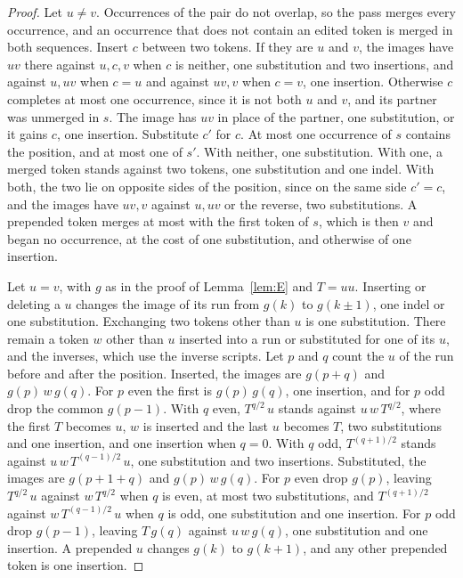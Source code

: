 \documentclass[11pt,a4paper]{article}
\theoremstyle{definition}
\theoremstyle{plain}
\begin{document}
\begin{proof}
Let \(u \ne v\). Occurrences of the pair do not overlap, so the pass merges every occurrence, and an occurrence that
does not contain an edited token is merged in both sequences. Insert \(c\) between two tokens. If they are \(u\) and
\(v\), the images have \(uv\) there against \(u, c, v\) when \(c\) is neither, one substitution and two insertions, and
against \(u, uv\) when \(c = u\) and against \(uv, v\) when \(c = v\), one insertion. Otherwise \(c\) completes at most
one occurrence, since it is not both \(u\) and \(v\), and its partner was unmerged in \(s\). The image has \(uv\) in
place of the partner, one substitution, or it gains \(c\), one insertion. Substitute \(c'\) for \(c\). At most one
occurrence of \(s\) contains the position, and at most one of \(s'\). With neither, one substitution. With one, a merged
token stands against two tokens, one substitution and one indel. With both, the two lie on opposite sides of the
position, since on the same side \(c' = c\), and the images have \(uv, v\) against \(u, uv\) or the reverse, two
substitutions. A prepended token merges at most with the first token of \(s\), which is then \(v\) and began no
occurrence, at the cost of one substitution, and otherwise of one insertion.

Let \(u = v\), with \(g\) as in the proof of Lemma~\ref{lem:E} and \(T = uu\). Inserting or deleting a \(u\) changes the
image of its run from \(g(k)\) to \(g(k \pm 1)\), one indel or one substitution. Exchanging two tokens other than \(u\)
is one substitution. There remain a token \(w\) other than \(u\) inserted into a run or substituted for one of its
\(u\), and the inverses, which use the inverse scripts. Let \(p\) and \(q\) count the \(u\) of the run before and after
the position. Inserted, the images are \(g(p + q)\) and \(g(p)\,w\,g(q)\). For \(p\) even the first is \(g(p)\,g(q)\),
one insertion, and for \(p\) odd drop the common \(g(p - 1)\). With \(q\) even, \(T^{q/2}\,u\) stands against
\(u\,w\,T^{q/2}\), where the first \(T\) becomes \(u\), \(w\) is inserted and the last \(u\) becomes \(T\), two
substitutions and one insertion, and one insertion when \(q = 0\). With \(q\) odd, \(T^{(q+1)/2}\) stands against
\(u\,w\,T^{(q-1)/2}\,u\), one substitution and two insertions. Substituted, the images are \(g(p + 1 + q)\) and
\(g(p)\,w\,g(q)\). For \(p\) even drop \(g(p)\), leaving \(T^{q/2}\,u\) against \(w\,T^{q/2}\) when \(q\) is even, at
most two substitutions, and \(T^{(q+1)/2}\) against \(w\,T^{(q-1)/2}\,u\) when \(q\) is odd, one substitution and one
insertion. For \(p\) odd drop \(g(p - 1)\), leaving \(T\,g(q)\) against \(u\,w\,g(q)\), one substitution and one
insertion. A prepended \(u\) changes \(g(k)\) to \(g(k + 1)\), and any other prepended token is one insertion.
\end{proof}
\end{document}
